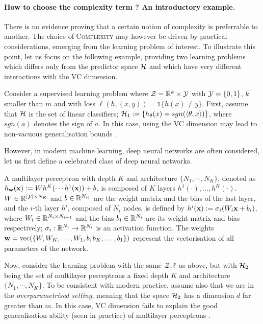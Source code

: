 \paragraph{How to choose the complexity term ? An introductory example.} There is no evidence proving that a certain notion of complexity is preferrable to another. The choice of \textsc{Complexity} may however be driven by practical considerations, emerging from the learning problem of interest. To illustrate this point, let us focus on the following example, providing two learning problems which differs only from the predictor space $\mathcal{H}$ and which have very different interactions with the VC dimension.
\begin{example}
  \label{ex: neural_net}
  Consider a supervised learning problem where $\mathcal{Z} = \mathbb{R}^k\times\mathcal{Y}$ with $\mathcal{Y}=\{0,1\}$, $k$ smaller than $m$ and with loss $\ell(h,(x,y))= \mathds{1}\{h(x) \neq y\}$.  First, assume that $\mathcal{H}$ is the set of linear classifiers; \ie $\mathcal{H}_1:= \left\{ h_{\theta}(x)= sgn(\langle \theta,x\rangle)  \right\}$, where $sgn(a)$ denotes the sign of $a$. In this case, using the VC dimension may lead to non-vacuous generalisation bounds \citep{vapnik2000learning}. 

However, in modern machine learning, deep neural networks are often considered, let us first define a celebrated class of deep neural networks. 

\begin{definition}
    \label{def:mlp}
    A multilayer perceptron with depth $K$ and architecture $\{N_1,\cdots,N_K\}$, denoted as $h_{\mathbf{w}}(\mathbf{x}) := Wh^{K}(\cdots h^{1}(\mathbf{x}))+b$, is composed of $K$ layers $h^1(\cdot),\dots,h^K(\cdot)$.
 $W\in\mathbb{R}^{|\mathcal{Y}|\times N_K}$ and $b\in\mathbb{R}^{N_K}$ are the weight matrix and the bias of the last layer, and the $i$-th layer $h^{i}$, composed of $N_i$ nodes, is defined by $h^{i}(\mathbf{x}):=\sigma_i(W_i \mathbf{x} + b_i)$, where $W_i\in\mathbb{R}^{N_i\times N_{i-1}}$ and the bias $b_i\in \mathbb{R}^{N_i}$ are its weight matrix and bias respectively; $\sigma_i : \mathbb{R}^{N_i} \to \mathbb{R}^{N_i} $ is an activation function.
The weights $\mathbf{w}=\operatorname*{\mathrm{vec}}(\{W, W_{K}, \dots, W_1, b, b_{K}, \dots, b_1\})$ represent the vectorisation of all parameters of the network.
\end{definition}
Now, consider the learning problem with the same $\mathcal{Z},\ell$ as above, but with $\mathcal{H}_2$ being the set of multilayer perceptrons \wrt a fixed depth $K$ and architecture $\{N_1,\cdots,N_K\}$. To be consistent with modern practice, assume also that we are in the \emph{overparametrised setting}, meaning that the space $\mathcal{H}_2$ has a dimension $d$ far greater than $m$.
In this case, VC dimension fails to explain the good generalisation ability (seen in practice) of multilayer perceptrons \citep{bartlett2003vapnik}.
\end{example}

